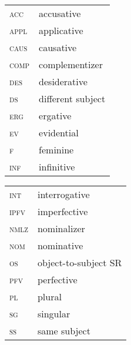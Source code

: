 \documentclass[output=paper,colorlinks,citecolor=brown,
]{langscibook}
\renewcommand{\sc}[1]{\textsc{#1}}
\begin{document}
\begin{tabularx}{.45\textwidth}{lQ}
\sc{acc}  & accusative       \\
\sc{appl} & applicative      \\
\sc{caus} & causative          \\
\sc{comp} & complementizer    \\
\sc{des}  & desiderative      \\
\sc{ds}   & different subject  \\
\sc{erg}  & ergative          \\
\sc{ev}   & evidential       \\
\sc{f}    & feminine          \\
\sc{inf}  & infinitive        \\
\end{tabularx}
\begin{tabularx}{.45\textwidth}{lQ}
\sc{int}  & interrogative        \\
\sc{ipfv} & imperfective         \\
 \sc{nmlz} & nominalizer          \\
 \sc{nom}  & nominative           \\
\sc{os}   & object-to-subject SR \\
\sc{pfv}  & perfective           \\
 \sc{pl}   & plural               \\
\sc{sg}   & singular             \\
\sc{ss}   & same subject         \\    
\end{tabularx}

\printbibliography[heading=subbibliography,notkeyword=this]
\end{document}
